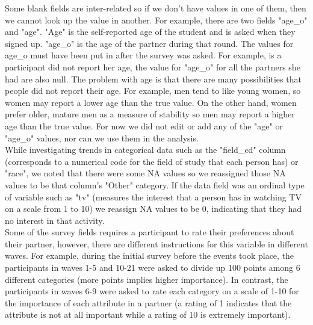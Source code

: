 \documentclass{article}
\begin{document}

Some blank fields are inter-related so if we don't have values in one of them, then we cannot look up the value in another. For example, there are two fields "age\_o" and "age". "Age" is the self-reported age of the student and is asked when they signed up. "age\_o" is the age of the partner during that round.  The values for age\_o must have been put in after the survey was asked.  For example, is a participant did not report her age, the value for "age\_o" for all the partners she had are also null.  The problem with age is that there are many possibilities that people did not report their age.  For example, men tend to like young women, so women may report a lower age than the true value.  On the other hand, women prefer older, mature men as a measure of stability so men may report a higher age than the true value.  For now we did not edit or add any of the "age" or "age\_o" values, nor can we use them in the analysis.\\

While investigating trends in categorical data such as the "field\_cd" column (corresponds to a numerical code for the field of study that each person has) or "race", we noted that there were some NA values  so we reassigned those NA values to be that column's "Other" category.  If the data field was an ordinal type of variable such as "tv" (measures the interest that a person has in watching TV on a scale from 1 to 10) we reassign NA values to be 0, indicating that they had no interest in that activity.\\

Some of the survey fields requires a participant to rate their preferences about their partner, however, there are different instructions for this variable in different waves.  For example, during the initial survey before the events took place, the participants in waves 1-5 and 10-21 were asked to divide up 100 points among 6 different categories (more points implies higher importance).  In contrast, the participants in waves 6-9 were asked to rate each category on a scale of 1-10 for the importance of each attribute in a partner (a rating of 1 indicates that the attribute is not at all important while a rating of 10 is extremely important).\\  
\end{document}

